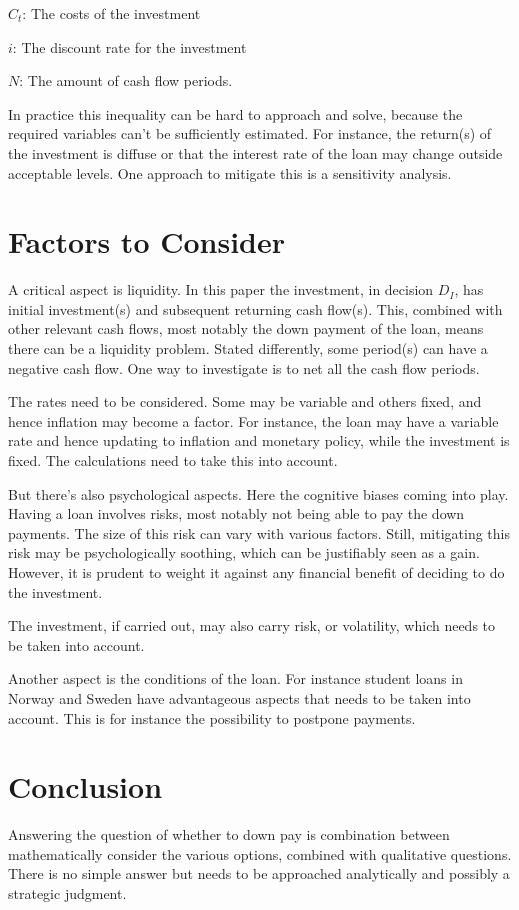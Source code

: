 \documentclass[a4paper]{article}
\begin{document}
$C_t$: The costs of the investment

$i$: The discount rate for the investment

$N$: The amount of cash flow periods.

In practice this inequality can be hard to approach and solve, because the
required variables can't be sufficiently estimated. For instance, the return(s)
of the investment is diffuse or that the interest rate of the loan may change
outside acceptable levels. One approach to mitigate this is a sensitivity
analysis.

\section{Factors to Consider}

A critical aspect is liquidity. In this paper the investment, in decision $D_I$,
has initial investment(s) and subsequent returning cash flow(s). This, combined
with other relevant cash flows, most notably the down payment of the loan, means
there can be a liquidity problem. Stated differently, some period(s) can have a
negative cash flow. One way to investigate is to net all the cash flow periods.

The rates need to be considered. Some may be variable and others fixed, and
hence inflation may become a factor. For instance, the loan may have a variable
rate and hence updating to inflation and monetary policy, while the investment
is fixed. The calculations need to take this into account.

But there's also psychological aspects. Here the cognitive biases coming into
play. Having a loan involves risks, most notably not being able to pay the
down payments. The size of this risk can vary with various factors. Still,
mitigating this risk may be psychologically soothing, which can be justifiably
seen as a gain. However, it is prudent to weight it against any financial
benefit of deciding to do the investment.

The investment, if carried out, may also carry risk, or volatility, which needs
to be taken into account.

Another aspect is the conditions of the loan. For instance student loans in
Norway and Sweden have advantageous aspects that needs to be taken into account.
This is for instance the possibility to postpone payments.

\section{Conclusion}

Answering the question of whether to down pay is combination between
mathematically consider the various options, combined with qualitative
questions. There is no simple answer but needs to be approached analytically and
possibly a strategic judgment.
\end{document}
